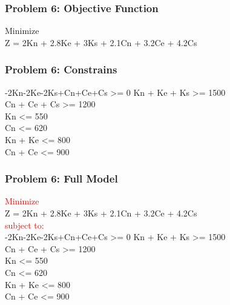 \documentclass[10pt,svgnames,fragile]{beamer}
\begin{document}
\begin{frame}[label={sec:orge9abdcb}]{}

\frametitle{Problem 6: Objective Function }
Minimize\\[1em]

Z = 2Kn + 2.8Ke + 3Ks + 2.1Cn + 3.2Ce + 4.2Cs



\end{frame}

\begin{frame}[label={sec:orge9abdcb}]{}
\frametitle{Problem 6: Constrains }

-2Kn-2Ke-2Ks+Cn+Ce+Cs >= 0
Kn + Ke + Ks >= 1500\\
Cn + Ce + Cs >= 1200\\
Kn <= 550\\
Cn <= 620\\
Kn + Ke <= 800\\
Cn + Ce <= 900

\end{frame}

\begin{frame}[label={sec:orge9abdcb}]{}
\frametitle{Problem 6: Full Model }
\textcolor{red}{Minimize}\\[1em]


Z = 2Kn + 2.8Ke + 3Ks + 2.1Cn + 3.2Ce + 4.2Cs\\[1em]
\textcolor{red}{subject to:}\\[1em]
-2Kn-2Ke-2Ks+Cn+Ce+Cs >= 0
Kn + Ke + Ks >= 1500\\
Cn + Ce + Cs >= 1200\\
Kn <= 550\\
Cn <= 620\\
Kn + Ke <= 800\\
Cn + Ce <= 900

\end{frame}
\end{document}
